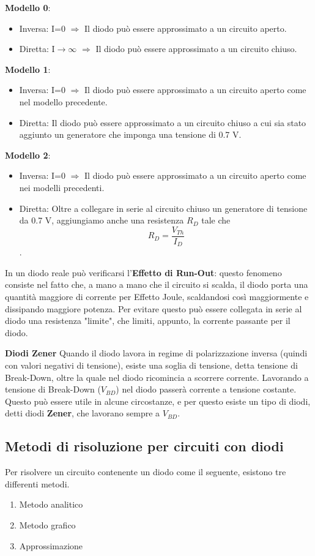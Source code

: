 \documentclass[\main/main.tex]{subfiles}
\begin{document}
\textbf{Modello 0}:
\begin{itemize} 
  	  \item Inversa: I=0  $\Rightarrow$ Il diodo può essere approssimato a un circuito aperto.
  	  \item Diretta: I$\rightarrow\infty$  $\Rightarrow$ Il diodo può essere approssimato a un circuito chiuso.
\end{itemize}
\textbf{Modello 1}:
\begin{itemize} 
  	  \item Inversa:  I=0  $\Rightarrow$  Il diodo può essere approssimato a un circuito aperto come nel modello precedente.
  	  \item Diretta: Il diodo può essere approssimato a un circuito chiuso a cui sia stato aggiunto un generatore che imponga una tensione di 0.7 V. 
\end{itemize} 
\textbf{Modello 2}:
\begin{itemize} 
  	  \item Inversa: I=0  $\Rightarrow$ Il diodo può essere approssimato a un circuito aperto come nei modelli precedenti.
  	  \item Diretta: Oltre a collegare in serie al circuito chiuso un generatore di tensione da 0.7 V, aggiungiamo anche una resistenza $R_D$ tale che \[R_D = \frac{V_{Th}}{I_D}\]. 
\end{itemize} 

In un diodo reale può verificarsi l'\textbf{Effetto di Run-Out}: questo fenomeno consiste nel fatto che, a mano a mano che il circuito si scalda, il diodo porta una quantità maggiore di corrente per Effetto Joule, scaldandosi così maggiormente e dissipando maggiore potenza. Per evitare questo può essere collegata in serie al diodo una resistenza "limite", che limiti, appunto, la corrente passante per il diodo. 


\textbf{Diodi Zener}
Quando il diodo lavora in regime di polarizzazione inversa (quindi con valori negativi di tensione), esiste una soglia di tensione, detta tensione di Break-Down, oltre la quale nel diodo ricomincia a scorrere corrente. 
Lavorando a tensione di Break-Down ($V_{BD}$) nel diodo passerà corrente a tensione costante. Questo può essere utile in alcune circostanze, e per questo esiste un tipo di diodi, detti diodi \textbf{Zener}, che lavorano sempre a $V_{BD}$. 


\subsection{Metodi di risoluzione per circuiti con diodi}
Per risolvere un circuito contenente un diodo come il seguente, esistono tre differenti metodi.
\begin{enumerate} 
	\item Metodo analitico
	\item Metodo grafico
	\item Approssimazione
\end{enumerate}
\end{document}
